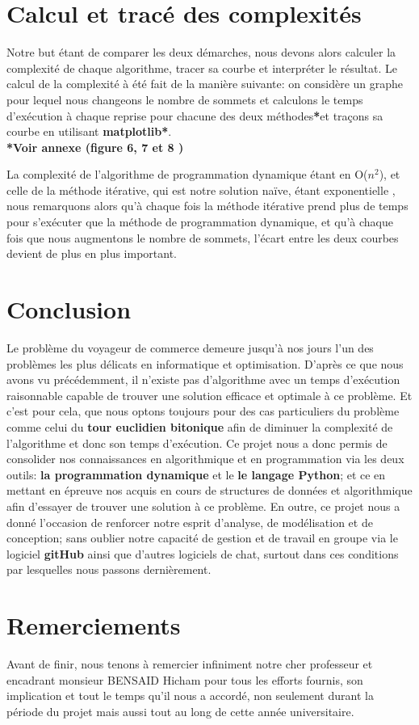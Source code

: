 \documentclass[12pt, openany]{report}
\begin{document}
\section{Calcul et tracé des complexités}
Notre but étant de comparer les deux démarches, nous devons alors calculer la complexité de chaque algorithme, tracer sa courbe et interpréter le résultat. Le calcul de la complexité à été fait de la manière suivante: on considère un graphe pour lequel nous changeons le nombre de sommets et calculons le temps d'exécution à chaque reprise pour chacune des deux méthodes\textbf{*}et traçons sa courbe en utilisant \textbf{matplotlib}\textbf{*}. \\
\textbf{*Voir annexe (figure 6, 7 et 8 )}
	
La complexité de l'algorithme de programmation dynamique étant en O($n^2$), et celle de la méthode itérative, qui est notre solution naïve, étant exponentielle , nous remarquons alors qu'à chaque fois la méthode itérative prend plus de temps pour s'exécuter que la méthode de programmation dynamique, et qu'à chaque fois que nous augmentons le nombre de sommets, l'écart entre les deux courbes devient de plus en plus important.

\section{Conclusion}
Le problème du voyageur de commerce demeure jusqu'à nos jours l'un des problèmes les plus délicats en informatique et optimisation. D'après ce que nous avons vu précédemment, il n'existe pas d'algorithme avec un temps d'exécution raisonnable capable de trouver une solution efficace et optimale à ce problème. Et c'est pour cela, que nous optons toujours pour des cas particuliers du problème comme celui du \textbf{tour euclidien bitonique} afin de diminuer la complexité de l'algorithme et donc son temps d'exécution. Ce projet nous a donc permis de consolider nos connaissances en algorithmique et en programmation via les deux outils: \textbf{la programmation dynamique} et le \textbf{le langage Python}; et ce en mettant en épreuve nos acquis en cours de structures de données et algorithmique afin d'essayer de trouver une solution à ce problème. En outre, ce projet nous a donné l'occasion de renforcer notre esprit d'analyse, de modélisation et de conception; sans oublier notre capacité de gestion et de travail en groupe via le logiciel \textbf{gitHub} ainsi que d'autres logiciels de chat, surtout dans ces conditions par lesquelles nous passons dernièrement.
\section{Remerciements} 
Avant de finir, nous tenons à remercier infiniment notre cher professeur et encadrant monsieur BENSAID Hicham pour tous les efforts fournis, son implication et tout le temps qu'il nous a accordé, non seulement durant la période du projet mais aussi tout au long de cette année universitaire. 
\end{document}
